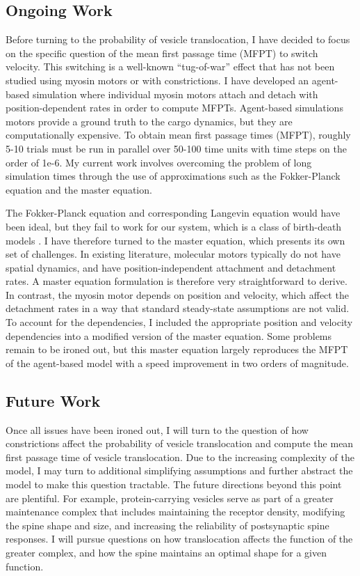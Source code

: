 \documentclass[a4paper,11pt]{article}
\begin{document}
\subsection{Ongoing Work}

Before turning to the probability of vesicle translocation, I have decided to focus on the specific question of the mean first passage time (MFPT) to switch velocity. This switching is a well-known ``tug-of-war'' effect \cite{julicher1995cooperative,guerin2011motion} that has not been studied using myosin motors or with constrictions. I have developed an agent-based simulation where individual myosin motors attach and detach with position-dependent rates in order to compute MFPTs. Agent-based simulations motors provide a ground truth to the cargo dynamics, but they are computationally expensive. To obtain mean first passage times (MFPT), roughly 5-10 trials must be run in parallel over 50-100 time units with time steps on the order of 1e-6. My current work involves overcoming the problem of long simulation times through the use of approximations such as the Fokker-Planck equation and the master equation.

The Fokker-Planck equation and corresponding Langevin equation would have been ideal, but they fail to work for our system, which is a class of birth-death models \cite{doering2005extinction}. I have therefore turned to the master equation, which presents its own set of challenges. In existing literature, molecular motors typically do not have spatial dynamics, and have position-independent attachment and detachment rates. A master equation formulation is therefore very straightforward to derive. In contrast, the myosin motor depends on position and velocity, which affect the detachment rates in a way that standard steady-state assumptions are not valid. To account for the dependencies, I included the appropriate position and velocity dependencies into a modified version of the master equation. Some problems remain to be ironed out, but this master equation largely reproduces the MFPT of the agent-based model with a speed improvement in two orders of magnitude.

\subsection{Future Work}

Once all issues have been ironed out, I will turn to the question of how constrictions affect the probability of vesicle translocation and compute the mean first passage time of vesicle translocation. Due to the increasing complexity of the model, I may turn to additional simplifying assumptions and further abstract the model to make this question tractable. The future directions beyond this point are plentiful. For example, protein-carrying vesicles serve as part of a greater maintenance complex that includes maintaining the receptor density, modifying the spine shape and size, and increasing the reliability of postsynaptic spine responses. I will pursue questions on how translocation affects the function of the greater complex, and how the spine maintains an optimal shape for a given function.
\end{document}
